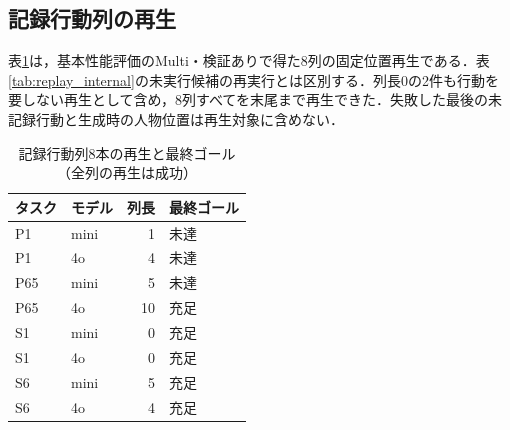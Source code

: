 \subsection{記録行動列の再生}
表\ref{tab:saved_replay_internal}は，基本性能評価のMulti・検証ありで得た8列の固定位置再生である．表\ref{tab:replay_internal}の未実行候補の再実行とは区別する．列長0の2件も行動を要しない再生として含め，8列すべてを末尾まで再生できた．失敗した最後の未記録行動と生成時の人物位置は再生対象に含めない．
\begin{table}[tb]
\caption{記録行動列8本の再生と最終ゴール（全列の再生は成功）}\label{tab:saved_replay_internal}
\centering\small
\setlength{\tabcolsep}{3pt}
\begin{tabular}{llrl}
\hline
タスク & モデル & 列長 & 最終ゴール \\
\hline
P1 & mini & 1 & 未達 \\
P1 & 4o & 4 & 未達 \\
P65 & mini & 5 & 未達 \\
P65 & 4o & 10 & 充足 \\
S1 & mini & 0 & 充足 \\
S1 & 4o & 0 & 充足 \\
S6 & mini & 5 & 充足 \\
S6 & 4o & 4 & 充足 \\
\hline
\end{tabular}
\end{table}
